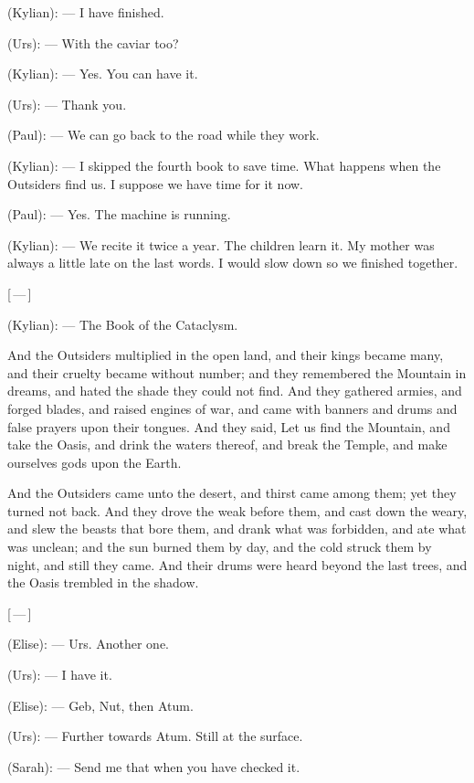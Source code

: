 \begin{room}
(Kylian): --- I have finished.

(Urs): --- With the caviar too?

(Kylian): --- Yes. You can have it.

(Urs): --- Thank you.

(Paul): --- We can go back to the road while they work.

(Kylian): --- I skipped the fourth book to save time. What happens when the Outsiders find us. I suppose we have time for it now.

(Paul): --- Yes. The machine is running.

(Kylian): --- We recite it twice a year. The children learn it. My mother was always a little late on the last words. I would slow down so we finished together.

\centerline{[\,---\,]}

(Kylian): --- The Book of the Cataclysm.

\begin{scripture}
And the Outsiders multiplied in the open land, and their kings became many, and their cruelty became without number; and they remembered the Mountain in dreams, and hated the shade they could not find. And they gathered armies, and forged blades, and raised engines of war, and came with banners and drums and false prayers upon their tongues. And they said, Let us find the Mountain, and take the Oasis, and drink the waters thereof, and break the Temple, and make ourselves gods upon the Earth.
\end{scripture}

\begin{scripture}
And the Outsiders came unto the desert, and thirst came among them; yet they turned not back. And they drove the weak before them, and cast down the weary, and slew the beasts that bore them, and drank what was forbidden, and ate what was unclean; and the sun burned them by day, and the cold struck them by night, and still they came. And their drums were heard beyond the last trees, and the Oasis trembled in the shadow.
\end{scripture}

\centerline{[\,---\,]}

(Elise): --- Urs. Another one.

(Urs): --- I have it.

(Elise): --- Geb, Nut, then Atum.

(Urs): --- Further towards Atum. Still at the surface.

(Sarah): --- Send me that when you have checked it.


\end{room}

